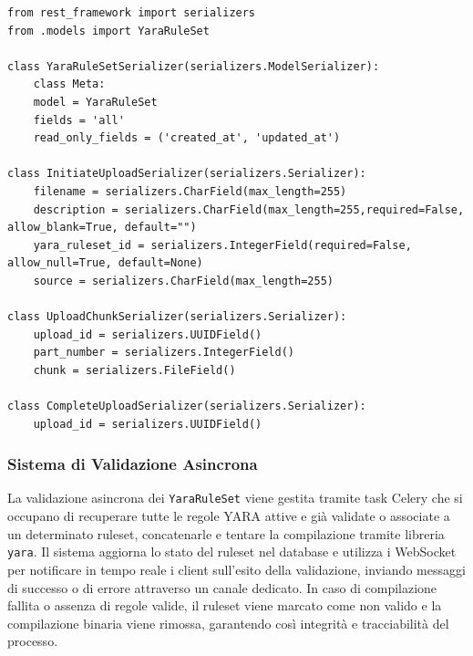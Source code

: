 \begin{verbatim}
from rest_framework import serializers
from .models import YaraRuleSet

class YaraRuleSetSerializer(serializers.ModelSerializer):
    class Meta:
    model = YaraRuleSet
    fields = 'all'
    read_only_fields = ('created_at', 'updated_at')

class InitiateUploadSerializer(serializers.Serializer):
    filename = serializers.CharField(max_length=255)
    description = serializers.CharField(max_length=255,required=False, allow_blank=True, default="")
    yara_ruleset_id = serializers.IntegerField(required=False, allow_null=True, default=None)
    source = serializers.CharField(max_length=255)

class UploadChunkSerializer(serializers.Serializer):
    upload_id = serializers.UUIDField()
    part_number = serializers.IntegerField()
    chunk = serializers.FileField()

class CompleteUploadSerializer(serializers.Serializer):
    upload_id = serializers.UUIDField()
\end{verbatim}

\subsubsection{Sistema di Validazione Asincrona}
La validazione asincrona dei \texttt{YaraRuleSet} viene gestita tramite task Celery che si occupano di recuperare tutte le regole YARA attive e già validate o associate a un determinato ruleset, concatenarle e tentare la compilazione tramite libreria \texttt{yara}.
Il sistema aggiorna lo stato del ruleset nel database e utilizza i WebSocket per notificare in tempo reale i client sull'esito della validazione, inviando messaggi di successo o di errore attraverso un canale dedicato.
In caso di compilazione fallita o assenza di regole valide, il ruleset viene marcato come non valido e la compilazione binaria viene rimossa, garantendo così integrità e tracciabilità del processo.

